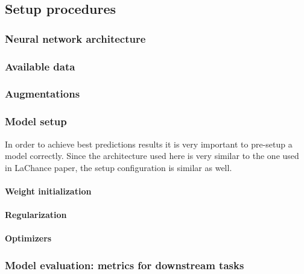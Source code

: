 \subsection{Setup procedures}
    \subsubsection{Neural network architecture}
        
    \subsubsection{Available data}
        
    \subsubsection{Augmentations}
        \label{section:augmentations}
        
    \subsubsection{Model setup}
        In order to achieve best predictions results it is very important to pre-setup a model correctly. Since the architecture used here is very similar to the one used in LaChance paper, the setup configuration is similar as well.  
        \paragraph{Weight initialization}
            
        \paragraph{Regularization}
            \label{section:regularization}
            
        \paragraph{Optimizers}
            
    \subsubsection{Model evaluation: metrics for downstream tasks}
        \label{section:model-evaluation}
        